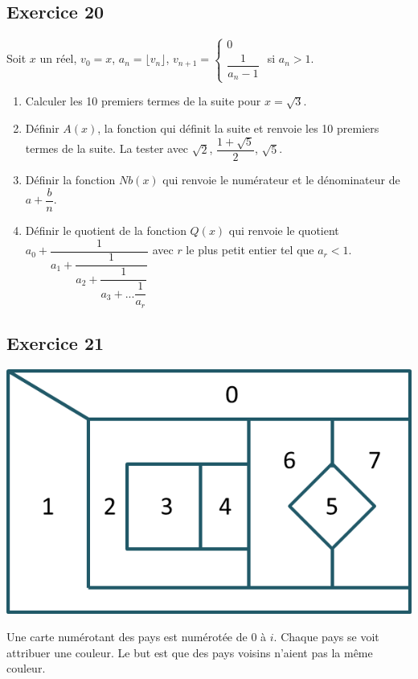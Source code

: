 \documentclass[10pt,fleqn]{article} %
\begin{document}
\begin{multicols}{2}
\subsection*{Exercice 20}
Soit $x$ un réel, $v_0=x$, $a_n = \lfloor v_n \rfloor$, $v_{n+1} = \left\{ \begin{array}{l} 0 \\ \dfrac{1}{a_n -1} \end{array} \right.$ si $a_n>1$.
\begin{enumerate}
\item Calculer les 10 premiers termes de la suite pour $x=\sqrt{3}$. 
\item Définir $A(x)$, la fonction qui définit la suite et renvoie les 10 premiers termes de la suite. La tester avec $\sqrt{2}$, $\dfrac{1+\sqrt{5}}{2}$, $\sqrt{5}$. 
\item Définir la fonction $Nb(x)$ qui renvoie le numérateur et le dénominateur de $a+\dfrac{b}{n}$. 
\item Définir le quotient de la fonction $Q(x)$ qui renvoie le quotient $a_0+\dfrac{1}{a_1+\dfrac{1}{a_2+\dfrac{1}{a_3+...\dfrac{1}{a_r}}}}$ avec $r$ le plus petit entier tel que $a_r<1$.
\end{enumerate}


\subsection*{Exercice 21}
\begin{center}
\includegraphics[width=.8\linewidth]{images/exo_21_pt_el.png}
\end{center}
Une carte numérotant des pays est numérotée de 0 à $i$.  Chaque pays se voit attribuer une couleur. Le but est que des pays voisins n'aient pas la même couleur. 


\end{multicols}
\end{document}
